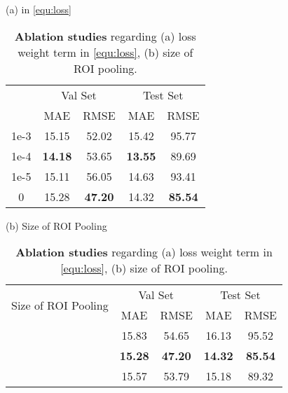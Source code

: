 \documentclass[10pt,twocolumn,letterpaper]{article}
\begin{document}
\begin{table}[t]
    \caption{\textbf{Ablation studies} regarding (a) loss weight term  in \cref{equ:loss}, (b) size of ROI pooling.}
    \vspace{5pt}
    \label{appendix:tab:ablation}
    \centering
    \scriptsize
    (a)  in \cref{equ:loss} \\
    \begin{minipage}[t]{0.5\textwidth}
        \centering
        \setlength\tabcolsep{8pt}
        \begin{tabular}{ccccc}
            \toprule
            \multirow{2}{*}{} 
            & \multicolumn{2}{c}{Val Set} & \multicolumn{2}{c}{Test Set} \\
            \cmidrule{2-5}
            & MAE & RMSE & MAE & RMSE \\
            \midrule
            1e-3 & 15.15 & 52.02 & 15.42 & 95.77 \\
            1e-4 & \textbf{14.18} & 53.65 & \textbf{13.55} & 89.69 \\
            1e-5 & 15.11 & 56.05 & 14.63 & 93.41 \\
            0    & 15.28 & \textbf{47.20} & 14.32 & \textbf{85.54} \\
            \bottomrule
        \end{tabular}
    \end{minipage}
    \vfill
    \vspace{5pt}
    (b) Size of ROI Pooling \\
    \begin{minipage}[t]{0.5\textwidth}
        \centering
        \setlength\tabcolsep{6pt}
        \begin{tabular}{ccccc}
            \toprule
            \multirow{2}{*}{Size of ROI Pooling} 
            & \multicolumn{2}{c}{Val Set} & \multicolumn{2}{c}{Test Set} \\
            \cmidrule{2-5}
            & MAE & RMSE & MAE & RMSE \\
            \midrule
             & 15.83 & 54.65  & 16.13 & 95.52 \\
             & \textbf{15.28} & \textbf{47.20} & \textbf{14.32} & \textbf{85.54} \\
             & 15.57 & 53.79 & 15.18 & 89.32 \\
            \bottomrule
        \end{tabular}
    \end{minipage}
\end{table}
\end{document}
